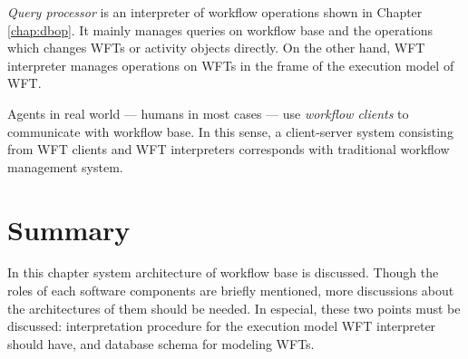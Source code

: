 \emph{Query processor} is an interpreter of workflow operations shown in 
Chapter \ref{chap:dbop}.  It mainly manages queries on workflow base and 
the operations which changes WFTs or activity objects directly.  On the
other hand, WFT interpreter manages operations on WFTs in the frame of
the execution model of WFT.

Agents in real world --- humans in most cases --- use \emph{workflow
clients} to communicate with workflow base.  In this sense, a
client-server system consisting from WFT clients and WFT interpreters
corresponds with traditional workflow management system.

\section{Summary}

In this chapter system architecture of workflow base is discussed.
Though the roles of each software components are briefly mentioned, more
discussions about the architectures of them should be needed.  In
especial, these two points must be discussed: interpretation procedure
for the execution model WFT interpreter should have, and database schema
for modeling WFTs.
